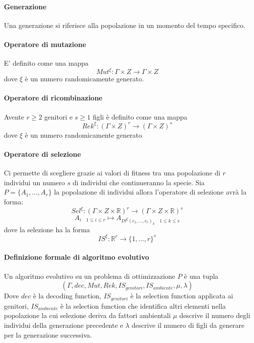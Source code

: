 \paragraph{Generazione}
Una generazione si riferisce alla popolazione in un momento del tempo specifico.

\paragraph{Operatore di mutazione}
E' definito come una mappa
$$Mut^{\xi} : \Gamma \times Z \to \Gamma \times Z$$
dove $\xi$ è un numero randomicamente generato.

\paragraph{Operatore di ricombinazione}
Avente $r \geq 2$ genitori e $s \geq 1$ figli è definito come una mappa
$$Rek^\xi : (\Gamma \times Z)^r \to (\Gamma \times Z)^s$$
dove $\xi$ è un numero randomicamente generato

\paragraph{Operatore di selezione}
Ci permette di scegliere grazie ai valori di fitness tra una popolazione di $r$ individui un numero $s$ di individui che continueranno la specie. Sia $P = \{A_1, \dots, A_r \} $ la popolazione di individui allora l'operatore di selezione avrà la forma:
$$Sel^\xi : (\Gamma \times Z \times \mathbb{R})^r \to (\Gamma \times Z \times \mathbb{R})^s$$
$$A_{i \quad 1 \leq i \leq r} \mapsto A_{IS^\xi (c_1,\dots,c_r)_k \quad 1 \leq k \leq s } $$
dove la selezione ha la forma
$$IS^\xi : \mathbb{R}^r \to \{ 1, \dots, r \}^s$$

\paragraph{Definizione formale di algoritmo evolutivo}
Un algoritmo evolutivo su un problema di ottimizzazione $P$ è una tupla $$(\Gamma, dec, Mut, Rek, IS_{genitori}, IS_{ambiente}, \mu, \lambda)$$
Dove $dec$ è la decoding function, $IS_{genitori}$ è la selection function applicata ai genitori, $IS_{ambiente}$ è la selection function che identifica altri elementi nella popolazione la cui selezione deriva da fattori ambientali $\mu$ descrive il numero degli individui della generazione precedente e $\lambda$ descrive il numero di figli da generare per la generazione successiva.

